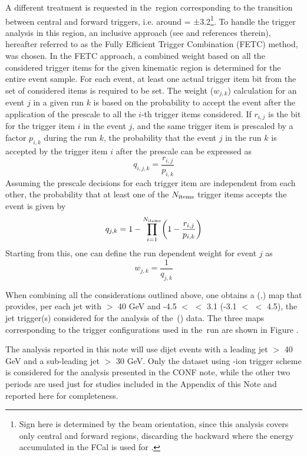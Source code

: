 A different treatment is requested in the \ETA\,region corresponding to the transition between central and forward triggers, i.e. around \ETA = $\pm$3.2\footnote{Sign here is determined by the beam orientation, since this analysis covers only central and forward regions, discarding the backward where the energy accumulated in the FCal is used for \EATPB.}. To handle the trigger analysis in this region, an inclusive approach (see \cite{Lendermann:2009ah} and references therein), hereafter referred to as the Fully Efficient Trigger Combination (FETC) method, was chosen.
In the FETC approach, a combined weight based on all the considered trigger items for the given kinematic region is determined for the entire event sample. For each event, at least one actual trigger item bit from the set of considered items is required to be set. The weight ($w_{j,k}$) calculation for an event $j$ in a given run $k$ is based on the probability to accept the event after the application of the prescale to all the $i$-th trigger items considered.
If $r_{i,j}$ is the bit for the trigger item $i$ in the event $j$, and the same trigger item is prescaled by a factor $p_{i,k}$ during the run $k$, the probability that the event $j$ in the run $k$ is accepted by the trigger item $i$ after the prescale can be expressed as
\begin{equation}
    q_{i,j,k} = \frac{r_{i,j}}{p_{i,k}}
\end{equation}
Assuming the prescale decisions for each trigger item are independent from each other, the probability that at least one of the $N_{\text{items}}$ trigger items accepts the event is given by
\begin{equation}
    q_{j,k} = 1 - \prod^{N_{\text{items}}}_{i=1} \biggl ( 1-\frac{r_{i,j}}{p_{i,k}}\biggr )
\end{equation}
Starting from this, one can define the run dependent weight for event $j$ as
\begin{equation}
    w_{j,k} = \frac{1}{q_{j,k}}
\end{equation}

When combining all the considerations outlined above, one obtains a (\ETA,\PT{}) map that provides, per each jet with \PT{}$>$ 40 GeV
and -4.5 $<$ \ETA $<$ 3.1 (-3.1 $<$ \ETA $<$ 4.5), the jet trigger(s) considered for the analysis of the \pxPb\,(\Pbxp) data. The three maps corresponding to the trigger configurations used in the \pxPb\,run are shown in Figure
.

The analysis reported in this note will use dijet events with a leading jet
\PT{}$>$ 40 GeV and a sub-leading jet \PT{}$>$ 30 GeV. Only the dataset using \pxPb-ion trigger scheme is considered for the analysis presented in the CONF note, while the other two periods are used just for studies included in the Appendix of this Note and reported here for completeness.

